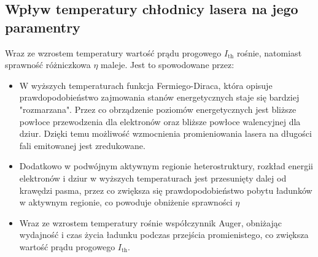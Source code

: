 \subsection{Wpływ temperatury chłodnicy lasera na jego paramentry}
Wraz ze wzrostem temperatury wartość prądu progowego $I_{\mathrm{th}}$ rośnie, natomiast sprawność różniczkowa $\eta$ maleje. Jest to spowodowane przez:
\begin{itemize}
\item W wyższych temperaturach funkcja Fermiego-Diraca, która opisuje prawdopodobieństwo zajmowania stanów energetycznych staje się bardziej "rozmarzana".
 Przez co obrządzenie poziomów energetycznych jest bliższe powłoce przewodzenia dla elektronów oraz bliższe powłoce walencyjnej dla dziur.
  Dzięki temu możliwość wzmocnienia promieniowania lasera na długości fali emitowanej jest zredukowane.
\item Dodatkowo w podwójnym aktywnym regionie heterostruktury, rozkład energii elektronów i dziur w wyższych temperaturach jest przesunięty dalej od krawędzi pasma, przez co zwiększa się prawdopodobieństwo pobytu ładunków w aktywnym regionie, co powoduje obniżenie sprawności $\eta$
\item Wraz ze wzrostem temperatury rośnie współczynnik Auger, obniżając wydajność i czas życia ładunku podczas przejścia promienistego, co zwiększa wartość prądu progowego $I_{\mathrm{th}}$.
\end{itemize}
